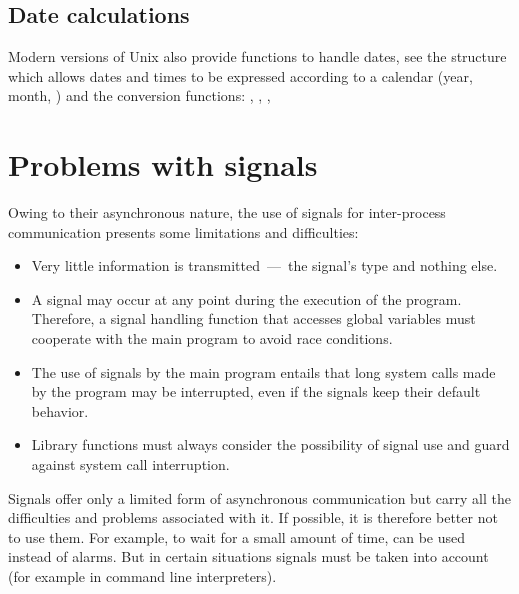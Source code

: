 \subsection*{Date calculations}

Modern versions of Unix also provide functions to handle dates, see
the structure  which allows dates and times to be
expressed according to a calendar (year, month, \etc) and the
conversion functions: ,
, , \etc

\section{Problems with signals}

Owing to their asynchronous nature, the use of signals for inter-process communication 
presents some limitations and difficulties:
%
\begin{itemize}

\item Very little information is transmitted~---~the signal's
type and nothing else.

\item A signal may occur at any point during the execution of the
  program. Therefore, a signal handling function that accesses global
  variables must cooperate with the main program to avoid race
  conditions. 

\item The use of signals by the main program entails that long system
  calls made by the program may be interrupted, even if the signals
  keep their default behavior.

\item Library functions must always consider the possibility of
  signal use and guard against system call interruption.

\end{itemize}
%

Signals offer only a limited form of asynchronous communication but
carry all the difficulties and problems associated with it. If possible,
it is therefore better not to use them. For example, to wait for a small
amount of time,  can be used instead of alarms. But
in certain situations signals must be taken into account (for example in
command line interpreters).

